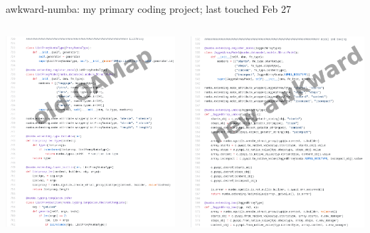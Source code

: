 \documentclass[aspectratio=169]{beamer}
\begin{document}
\begin{frame}{awkward-numba: my primary coding project; last touched Feb 27}
\vspace{0.25 cm}

\begin{columns}[t]
\includegraphics[width=\linewidth]{numbafied-oamap.png}

\includegraphics[width=\linewidth]{numbafied-awkward.png}
\end{columns}
\end{frame}
\end{document}
